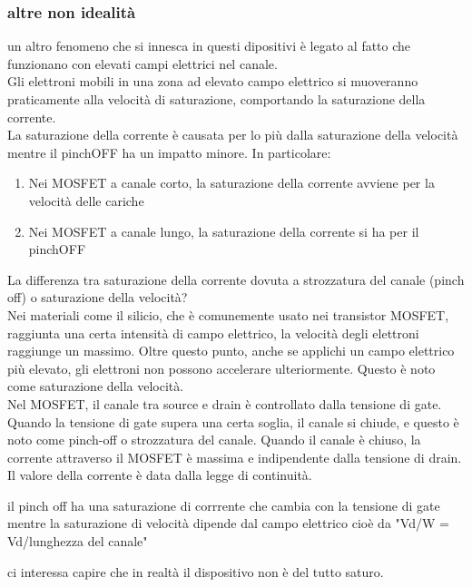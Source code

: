 \subsubsection{altre non idealità}
    un altro fenomeno che si innesca in questi dipositivi è legato al fatto che funzionano con elevati campi elettrici nel canale.\\
    Gli elettroni mobili in una zona ad elevato campo elettrico si muoveranno praticamente alla velocità di saturazione, comportando la saturazione della corrente.\\
    La saturazione della corrente è causata per lo più dalla saturazione della velocità mentre il pinchOFF ha un impatto minore. In particolare:
    \begin{enumerate}
        \item Nei MOSFET a canale corto, la saturazione della corrente avviene per la velocità delle cariche
        \item Nei MOSFET a canale lungo, la saturazione della corrente si ha per il pinchOFF
    \end{enumerate}
\begin{psbox}
    La differenza tra saturazione della corrente dovuta a strozzatura del canale (pinch off) o saturazione della velocità?\\

    Nei materiali come il silicio, che è comunemente usato nei transistor MOSFET, raggiunta una certa intensità di campo elettrico, la velocità degli elettroni raggiunge un massimo. Oltre questo punto, anche se applichi un campo elettrico più elevato, gli elettroni non possono accelerare ulteriormente. Questo è noto come saturazione della velocità.\\

    Nel MOSFET, il canale tra source e drain è controllato dalla tensione di gate. Quando la tensione di gate supera una certa soglia, il canale si chiude, e questo è noto come pinch-off o strozzatura del canale. Quando il canale è chiuso, la corrente attraverso il MOSFET è massima e indipendente dalla tensione di drain. Il valore della corrente è data dalla legge di continuità.

    il pinch off ha una saturazione di corrrente che cambia con la tensione di gate mentre la saturazione di velocità dipende dal campo elettrico cioè da "Vd/W = Vd/lunghezza del canale"
\end{psbox}

ci interessa capire che in realtà il dispositivo non è del tutto saturo.\\

